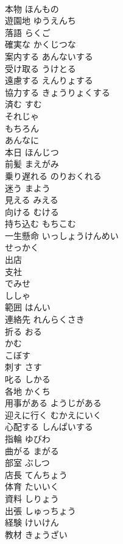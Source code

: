 \documentclass[8pt]{extreport}
\begin{document}
\begin{CJK}{UTF8}{min}
\\	本物	ほんもの	
\\	遊園地	ゆうえんち	
\\	落語	らくご	
\\	確実な	かくじつな	
\\	案内する	あんないする	
\\	受け取る	うけとる	
\\	遠慮する	えんりょする	
\\	協力する	きょうりょくする	
\\	済む	すむ	
\\	それじゃ		
\\	もちろん		
\\	あんなに		
\\	本日	ほんじつ	
\\	前髪	まえがみ	
\\	乗り遅れる	のりおくれる	
\\	迷う	まよう	
\\	見える	みえる	
\\	向ける	むける	
\\	持ち込む	もちこむ	
\\	一生懸命	いっしょうけんめい	
\\	せっかく		
\\	出店
\\	支社
\\	でみせ
\\	ししゃ
\\	範囲	はんい	
\\	連絡先	れんらくさき	
\\	折る	おる	
\\	かむ		
\\	こぼす		
\\	刺す	さす	
\\	叱る	しかる	
\\	各地	かくち	
\\	用事がある	ようじがある	
\\	迎えに行く	むかえにいく	
\\	心配する	しんぱいする	
\\	指輪	ゆびわ	
\\	曲がる	まがる	
\\	部室	ぶしつ	
\\	店長	てんちょう	
\\	体育	たいいく	
\\	資料	しりょう	
\\	出張	しゅっちょう	
\\	経験	けいけん	
\\	教材	きょうざい	

\end{CJK}
\end{document}
